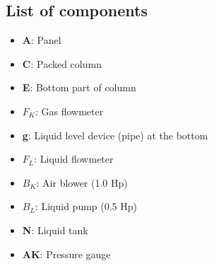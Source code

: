 \subsection{List of components}
\begin{itemize}
    \item \textbf{A}: Panel
    \item \textbf{C}: Packed column
    \item \textbf{E}: Bottom part of column
    \item \textbf{$F_K$}: Gas flowmeter
    \item \textbf{g}: Liquid level device (pipe) at the bottom
    \item \textbf{$F_L$}: Liquid flowmeter
    \item \textbf{$B_K$}: Air blower (1.0 Hp)
    \item \textbf{$B_L$}: Liquid pump (0.5 Hp)
    \item \textbf{N}: Liquid tank
    \item \textbf{AK}: Pressure gauge
\end{itemize}
